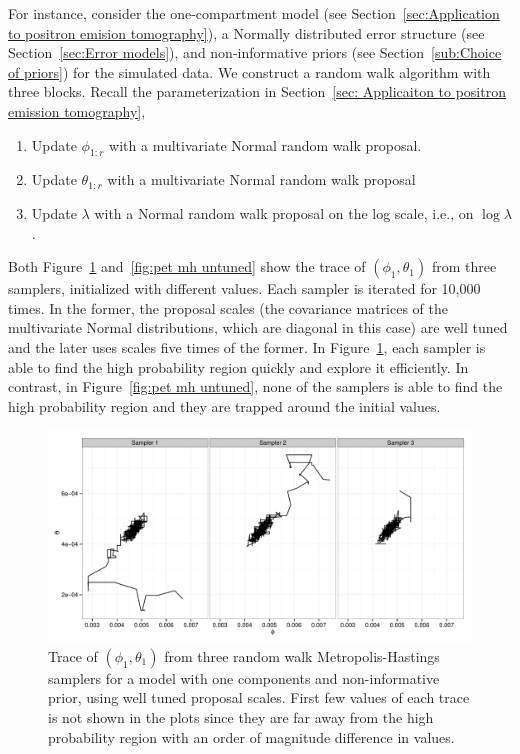 For instance, consider the one-compartment \pet model (see
Section~\ref{sec:Application to positron emision tomography}), a Normally
distributed error structure (see Section~\ref{sec:Error models}), and
non-informative priors (see Section~\ref{sub:Choice of priors}) for the
simulated data. We construct a random walk algorithm with three blocks. Recall
the parameterization in Section~\ref{sec: Applicaiton to positron emission
  tomography},
\begin{enumerate}
  \item Update $\phi_{1:r}$ with a multivariate Normal random walk proposal.
  \item Update $\theta_{1:r}$ with a multivariate Normal random walk proposal
  \item Update $\lambda$ with a Normal random walk proposal on the log scale,
    i.e., on $\log\lambda$.
\end{enumerate}
Both Figure~\ref{fig:pet mh tuned} and~\ref{fig:pet mh untuned} show the trace
of $(\phi_1, \theta_1)$ from three samplers, initialized with different
values. Each sampler is iterated for 10,000 times. In the former, the proposal
scales (the covariance matrices of the multivariate Normal distributions,
which are diagonal in this case) are well tuned and the later uses scales five
times of the former. In Figure~\ref{fig:pet mh tuned}, each sampler is able to
find the high probability region quickly and explore it efficiently. In
contrast, in Figure~\ref{fig:pet mh untuned}, none of the samplers is able to
find the high probability region and they are trapped around the initial
values.

\begin{figure}
  \includegraphics[width=\linewidth]{fig/PET_MH_Path.pdf}
  \caption[Trace of parameters in the random walk algorithm for the
  \protect\pet compartmental model (calibrated)]
  {Trace of $(\phi_1,\theta_1)$ from three random walk
    Metropolis-Hastings samplers for a \pet model with one components and
    non-informative prior, using well tuned proposal scales. First few values
    of each trace is not shown in the plots since they are far away from the
    high probability region with an order of magnitude difference in values.}
  \label{fig:pet mh tuned}
\end{figure}


